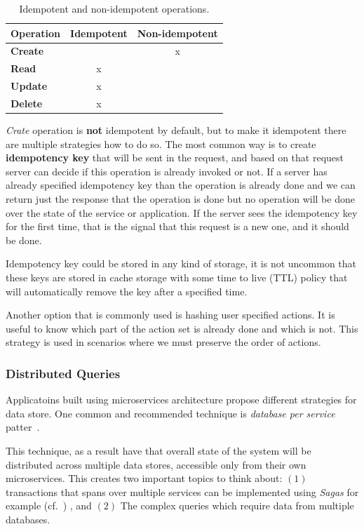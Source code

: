 \begin{table}[h!]
	\begin{center}
		\begin{tabular}{l|c|c}
			\textbf{Operation} & \textbf{Idempotent} & \textbf{Non-idempotent}\\
			\hline
			\textbf{Create} &  & x \\
			\textbf{Read} & x & \\
			\textbf{Update} & x & \\
			\textbf{Delete} & x & \\
		\end{tabular}
	\end{center}
	\vspace{-0.5cm}
	\caption{Idempotent and non-idempotent operations.}
	\label{tab:table8}
\end{table}

\noindent
\emph{Crate} operation is \textbf{not} idempotent by default, but to make it idempotent there are multiple strategies how to do so. The most common way is to create \textbf{idempotency key} that will be sent in the request, and based on that request server can decide if this operation is already invoked or not. If a server has already  specified idempotency key than the operation is already done and we can return just the response that the operation is done but no operation will be done over the state of the service or application. If the server sees the idempotency key for the first time, that is the signal that this request is a new one, and it should be done.

Idempotency key could be stored in any kind of storage, it is not uncommon that these keys are stored in cache storage with some time to live (TTL) policy that will automatically remove the key after a specified time.

Another option that is commonly used is hashing user specified actions. It is useful to know which part of the action set is already done and which is not. This strategy is used in scenarios where we must preserve the order of actions.
%
%
\subsubsection{Distributed Queries}
%
Applicatoins built using microservices architecture propose different strategies for data store. One common and recommended technique is \emph{database per service} patter~\cite{richardson2018microservices}.

This technique, as a result have that overall state of the system will be distributed across multiple data stores, accessible only from their own microservices. This creates two important topics to think about: $(1)$ transactions that spans over multiple services can be implemented using \emph{Sagas} for example (cf.~\pageref{sec:sagas})
, and $(2)$ The complex queries which require data from multiple databases.

